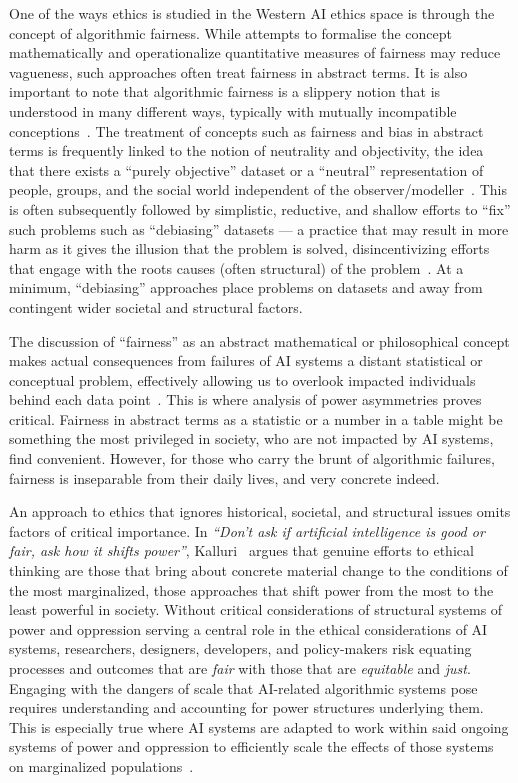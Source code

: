 \documentclass[manuscript]{acmart}
\begin{document}
One of the ways ethics is studied in the Western AI ethics space is through the concept of algorithmic fairness. 
While attempts to formalise the concept mathematically and operationalize quantitative measures of fairness may reduce vagueness, such approaches often treat fairness in abstract terms. It is also important to note that algorithmic fairness is a slippery notion that is understood in many different ways, typically with mutually incompatible conceptions~\cite{friedler2016possibility}. The treatment of concepts such as fairness and bias in abstract terms is frequently linked to the notion of neutrality and objectivity, the idea that there exists a ``purely objective'' dataset or a ``neutral'' representation of people, groups, and the social world independent of the observer/modeller~\cite{birhane2021algorithmic,benjamin2019race}. This is often subsequently followed by simplistic, reductive, and shallow efforts to ``fix'' such problems such as ``debiasing'' datasets --- a practice that may result in more harm as it gives the illusion that the problem is solved, disincentivizing efforts that %
engage with the roots causes (often structural) of the problem~\cite{gonen2019lipstick}. At a minimum, ``debiasing'' approaches place problems on datasets and away from contingent wider societal and structural factors.      

The discussion of ``fairness'' as an abstract mathematical or philosophical concept makes actual consequences from failures of AI systems a distant statistical or conceptual problem, effectively allowing us to overlook impacted individuals behind each data point~\cite{d2020data,raji2020discomfort}. This is where analysis of power asymmetries proves critical. Fairness in abstract terms as a statistic or a number in a table might be something the most privileged in society, who are not impacted by AI systems, find convenient. %
However, for those who carry the brunt of algorithmic failures, fairness is inseparable from their daily lives, and very concrete indeed. 

An approach to ethics that ignores historical, societal, and structural issues omits factors of critical importance.
In \textit{``Don't ask if artificial intelligence is good or fair, ask how it shifts power''}, Kalluri~\cite{kalluri2020don} argues that genuine efforts to ethical thinking are those that bring about concrete material change to the conditions of the most marginalized, those approaches that shift power from the most to the least powerful in society. Without critical considerations of structural systems of power and oppression serving a central role in the ethical considerations of AI systems, researchers, designers, developers, and policy-makers risk equating processes and outcomes that are \textit{fair} with those that are \textit{equitable} and \textit{just}. Engaging with the dangers of scale that AI-related algorithmic systems pose requires understanding and accounting for power structures underlying them. This is especially true where AI systems are adapted to work within said ongoing systems of power and oppression to efficiently scale the effects of those systems on marginalized populations~\cite{eubanks2018automating,noble2018algorithms}.
\end{document}
